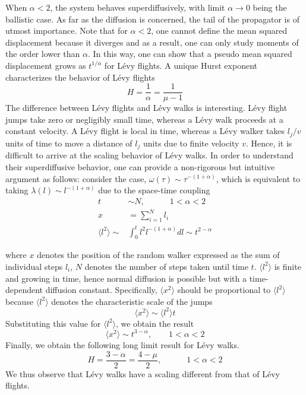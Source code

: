 \documentclass[12pt]{report}
\begin{document}
\begin{justify}
When $\alpha < 2$, the system behaves superdiffusively,  with limit $\alpha \to 0$ being the ballistic case. As far as the diffusion is concerned, the tail of the propagator is of utmost importance. Note that for $\alpha < 2$, one cannot define the mean squared displacement because it diverges and as a result, one can only study moments of the order lower than $\alpha$. In this way, one can show that a pseudo mean squared displacement grows as $t^{1/\alpha}$ for L\'evy flights. A unique Hurst exponent characterizes the behavior of L\'evy flights
\begin{equation}
H = \frac{1}{\alpha} = \frac{1}{\mu - 1}
\end{equation}
The difference between L\'evy flights and L\'evy walks is interesting. L\'evy flight jumps take zero or negligibly small time, whereas a L\'evy walk proceeds at a constant velocity. A L\'evy flight is local in time, whereas a L\'evy walker takes $l_j/v$ units of time to move a distance of $l_j$ units due to finite velocity $v$. Hence, it is difficult to arrive at the scaling behavior of L\'evy walks. In order to understand their superdiffusive behavior, one can provide a non-rigorous but intuitive argument as follows: consider the case,  $\omega(\tau) \sim \tau^{-(1 + \alpha) }$, which is equivalent to taking $\lambda(l) \sim l^{-(1 + \alpha)}$ due to the space-time coupling
\begin{equation}
\begin{split}
t &\sim N, \quad \quad \quad 1 < \alpha < 2\\
x &= \sum_{i=1}^N l_i \\
\langle l^2 \rangle \sim& \int_0^t l^2  l^{-(1 + \alpha)} dl \sim t^{2 - \alpha}
\end{split}
\end{equation}

where $x$ denotes the position of the random walker expressed as the sum of individual steps $l_i$, $N$ denotes the number of steps taken until time $t$. $\langle l^2 \rangle$ is finite and growing in time, hence normal diffusion is possible but with a time-dependent diffusion constant. Specifically, $\langle x^2 \rangle$ should be proportional to $\langle l^2 \rangle$ because $\langle l^2 \rangle$ denotes the characteristic scale of the jumps
\begin{equation}
\langle x^2 \rangle \sim \langle l^2 \rangle t
\end{equation}
Substituting this value for $\langle l^2 \rangle$, we obtain the result
\begin{equation}
\langle x^2 \rangle \sim t^{3 - \alpha}, \quad \quad 1 < \alpha < 2
\end{equation}
Finally, we obtain the following long limit result for L\'evy walks.
\begin{equation}
H = \frac{3 - \alpha}{2} = \frac{4 - \mu}{2}, \quad\quad\quad 1 < \alpha < 2
\end{equation}
We thus observe that L\'evy walks have a scaling different from that of L\'evy flights. 


\end{justify}
\end{document}
